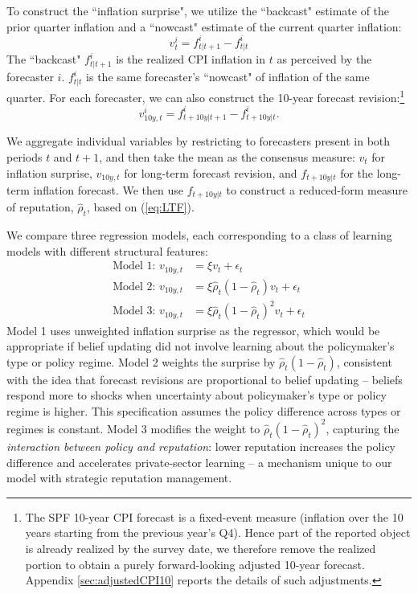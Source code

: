 \documentclass[12pt,letter,leqno]{article}
\theoremstyle{asn}
\theoremstyle{lem}
\theoremstyle{slem}
\theoremstyle{prop}
\theoremstyle{appprop}
\theoremstyle{rem}
\theoremstyle{defn}
\begin{document}
To construct the ``inflation surprise", we utilize the ``backcast" estimate of the prior quarter inflation and a ``nowcast" estimate of the current quarter inflation: 
\[
v_{t}^{i}=f_{t|t+1}^{i}-f_{t|t}^{i}
\]
The ``backcast" $f_{t|t+1}^{i}$ is the realized CPI inflation in $t$ as perceived by the forecaster $i$. $f_{t|t}^{i}$ is the same forecaster's ``nowcast" of inflation of the same quarter. 
For each forecaster, we can also construct the 10-year forecast revision:\footnote{The SPF 10-year CPI forecast is a fixed-event measure (inflation over the 10 years starting from the previous year’s Q4). Hence part of the reported object is already realized by the survey date, we therefore remove the realized portion to obtain a purely forward-looking adjusted 10-year forecast. Appendix \ref{sec:adjustedCPI10} reports the details of such adjustments.}
\[
v_{10y,t}^{i}=f_{t+10y|t+1}^{i}-f_{t+10y|t}^{i}.
\]

We aggregate individual variables by restricting to forecasters present in both periods $t$ and $t+1$, and then take the mean as the consensus measure: $v_t$ for inflation surprise, $v_{10y,t}$ for long-term forecast revision, and $f_{t+10y|t}$ for the long-term inflation forecast. We then use $f_{t+10y|t}$ to construct a reduced-form measure of reputation, $\widehat{\rho}_t$, based on (\ref{eq:LTF}).

We compare three regression models, each corresponding to a class of learning models with different structural features:
\begin{align*}
     \text{Model 1: }v_{10y,t}&=\xi v_t + \epsilon_t \\
     \text{Model 2: }v_{10y,t}&=\xi \widehat{\rho}_t(1-\widehat{\rho}_t) v_t + \epsilon_t \\
     \text{Model 3: }v_{10y,t}&=\xi \widehat{\rho}_t(1-\widehat{\rho}_t)^2 v_t + \epsilon_t
\end{align*}
Model 1 uses unweighted inflation surprise as the regressor, which would be appropriate if belief updating did not involve learning about the policymaker’s type or policy regime. Model 2 weights the surprise by $\widehat{\rho}_t(1 - \widehat{\rho}_t)$, consistent with the idea that forecast revisions are proportional to belief updating -- beliefs respond more to shocks when uncertainty about policymaker's type or policy regime is higher. This specification assumes the policy difference across types or regimes is constant. Model 3 modifies the weight to $\widehat{\rho}_t(1 - \widehat{\rho}_t)^2$, capturing the \textit{interaction between policy and reputation}: lower reputation increases the policy difference and accelerates private-sector learning -- a mechanism unique to our model with strategic reputation management. 
\end{document}
